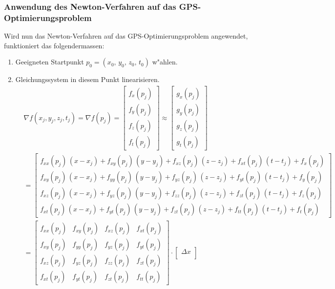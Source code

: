 \begin{refsection}
\subsubsection{Anwendung des Newton-Verfahren auf das GPS-Optimierungsproblem}
Wird nun das Newton-Verfahren auf das GPS-Optimierungsproblem angewendet,
funktioniert das folgendermassen:
\begin{enumerate}
\item Geeigneten Startpunkt $p_0 = (x_0,\,y_0,\,z_0,\,t_0)$ w"ahlen.
\item Gleichungssystem in diesem Punkt linearisieren.\\[0.2cm]
\begin{align*}
&\nabla f (x_j,y_j,z_j,t_j) = \nabla f (p_j) =  
\begin{bmatrix}
f_x(p_j) \\
f_y(p_j) \\
f_z(p_j) \\
f_t(p_j)
\end{bmatrix} \approx
\begin{bmatrix} g_x(p_j) \\
g_y(p_j) \\
g_z(p_j) \\
g_t(p_j)
\end{bmatrix}\\
&= \begin{bmatrix} f_{xx}(p_j)\, (x-x_j) + f_{xy}(p_j)\, (y-y_j) + f_{xz}(p_j)\, (z-z_j) + f_{xt}(p_j)\, (t-t_j) + f_x(p_j) \\
f_{xy}(p_j)\, (x-x_j) + f_{yy}(p_j)\, (y-y_j) + f_{yz}(p_j)\, (z-z_j) + f_{yt}(p_j)\, (t-t_j) + f_y(p_j) \\
f_{xz}(p_j)\, (x-x_j) + f_{yz}(p_j)\, (y-y_j) + f_{zz}(p_j)\, (z-z_j) + f_{zt}(p_j)\, (t-t_j) + f_z(p_j) \\
f_{xt}(p_j)\, (x-x_j) + f_{yt}(p_j)\, (y-y_j) + f_{zt}(p_j)\, (z-z_j) + f_{tt}(p_j)\, (t-t_j) + f_t(p_j) 
\end{bmatrix}\\
&= \begin{bmatrix} 
f_{xx}(p_j) &  f_{xy}(p_j) & f_{xz}(p_j) & f_{xt}(p_j)\\
f_{xy}(p_j) & f_{yy}(p_j) & f_{yz}(p_j) & f_{yt}(p_j)\\
f_{xz}(p_j) & f_{yz}(p_j) & f_{zz}(p_j) & f_{zt}(p_j)\\
f_{xt}(p_j) & f_{yt}(p_j) & f_{zt}(p_j) & f_{tt}(p_j)
\end{bmatrix} \cdot
\begin{bmatrix} 
\Delta x \\

\end{bmatrix}
\end{align*}
\end{enumerate}
\end{refsection}
